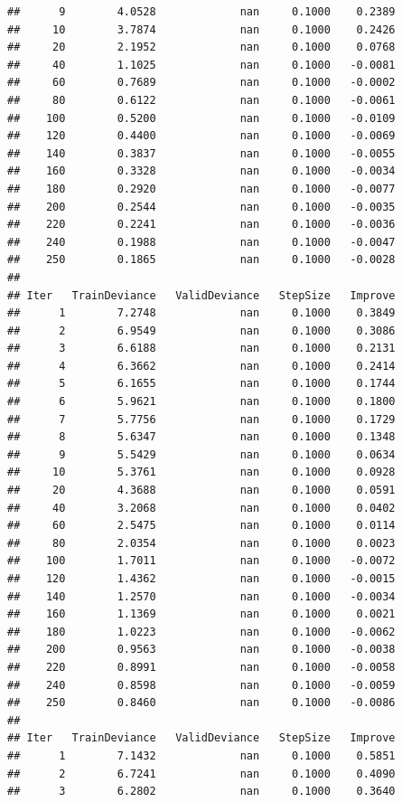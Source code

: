 \documentclass[]{book}
\begin{document}
\begin{verbatim}
##      9        4.0528             nan     0.1000    0.2389
##     10        3.7874             nan     0.1000    0.2426
##     20        2.1952             nan     0.1000    0.0768
##     40        1.1025             nan     0.1000   -0.0081
##     60        0.7689             nan     0.1000   -0.0002
##     80        0.6122             nan     0.1000   -0.0061
##    100        0.5200             nan     0.1000   -0.0109
##    120        0.4400             nan     0.1000   -0.0069
##    140        0.3837             nan     0.1000   -0.0055
##    160        0.3328             nan     0.1000   -0.0034
##    180        0.2920             nan     0.1000   -0.0077
##    200        0.2544             nan     0.1000   -0.0035
##    220        0.2241             nan     0.1000   -0.0036
##    240        0.1988             nan     0.1000   -0.0047
##    250        0.1865             nan     0.1000   -0.0028
## 
## Iter   TrainDeviance   ValidDeviance   StepSize   Improve
##      1        7.2748             nan     0.1000    0.3849
##      2        6.9549             nan     0.1000    0.3086
##      3        6.6188             nan     0.1000    0.2131
##      4        6.3662             nan     0.1000    0.2414
##      5        6.1655             nan     0.1000    0.1744
##      6        5.9621             nan     0.1000    0.1800
##      7        5.7756             nan     0.1000    0.1729
##      8        5.6347             nan     0.1000    0.1348
##      9        5.5429             nan     0.1000    0.0634
##     10        5.3761             nan     0.1000    0.0928
##     20        4.3688             nan     0.1000    0.0591
##     40        3.2068             nan     0.1000    0.0402
##     60        2.5475             nan     0.1000    0.0114
##     80        2.0354             nan     0.1000    0.0023
##    100        1.7011             nan     0.1000   -0.0072
##    120        1.4362             nan     0.1000   -0.0015
##    140        1.2570             nan     0.1000   -0.0034
##    160        1.1369             nan     0.1000    0.0021
##    180        1.0223             nan     0.1000   -0.0062
##    200        0.9563             nan     0.1000   -0.0038
##    220        0.8991             nan     0.1000   -0.0058
##    240        0.8598             nan     0.1000   -0.0059
##    250        0.8460             nan     0.1000   -0.0086
## 
## Iter   TrainDeviance   ValidDeviance   StepSize   Improve
##      1        7.1432             nan     0.1000    0.5851
##      2        6.7241             nan     0.1000    0.4090
##      3        6.2802             nan     0.1000    0.3640

\end{verbatim}
\end{document}
